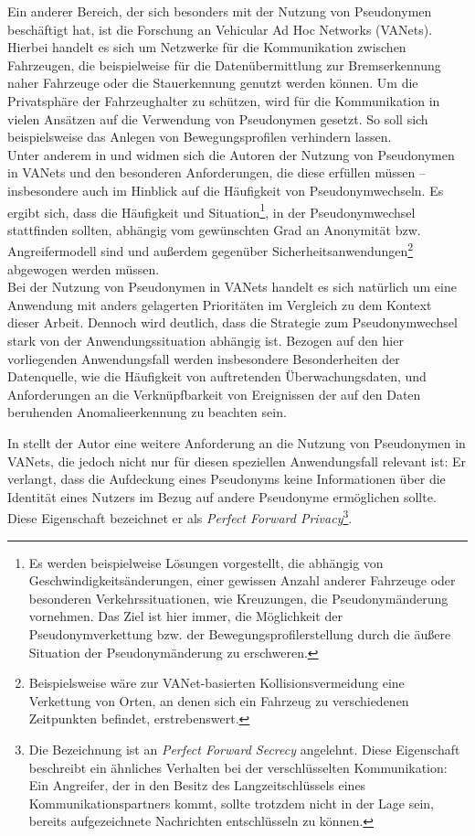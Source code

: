 Ein anderer Bereich, der sich besonders mit der Nutzung von Pseudonymen beschäftigt hat, ist die Forschung an Vehicular Ad Hoc Networks (VANets). Hierbei handelt es sich um Netzwerke für die Kommunikation zwischen Fahrzeugen, die beispielweise für die Datenübermittlung zur Bremserkennung naher Fahrzeuge oder die Stauerkennung genutzt werden können. Um die Privatsphäre der Fahrzeughalter zu schützen, wird für die Kommunikation in vielen Ansätzen auf die Verwendung von Pseudonymen gesetzt. So soll sich beispielsweise das Anlegen von Bewegungsprofilen verhindern lassen.\\
Unter anderem in \cite{dotzer2005} und \cite{petit2015} widmen sich die Autoren der Nutzung von Pseudonymen in VANets und den besonderen Anforderungen, die diese erfüllen müssen -- insbesondere auch im Hinblick auf die Häufigkeit von Pseudonymwechseln. Es ergibt sich, dass die Häufigkeit und Situation\footnote{
  Es werden beispielweise Lösungen vorgestellt, die abhängig von Geschwindigkeitsänderungen, einer gewissen Anzahl anderer Fahrzeuge oder besonderen Verkehrssituationen, wie Kreuzungen, die Pseudonymänderung vornehmen. Das Ziel ist hier immer, die Möglichkeit der Pseudonymverkettung bzw. der Bewegungsprofilerstellung durch die äußere Situation der Pseudonymänderung zu erschweren.
}, in der Pseudonymwechsel stattfinden sollten, abhängig vom gewünschten Grad an Anonymität bzw. Angreifermodell sind und außerdem gegenüber Sicherheitsanwendungen\footnote{
  Beispielsweise wäre zur VANet-basierten Kollisionsvermeidung eine Verkettung von Orten, an denen sich ein Fahrzeug zu verschiedenen Zeitpunkten befindet, erstrebenswert.
}  abgewogen werden müssen.\\
Bei der Nutzung von Pseudonymen in VANets handelt es sich natürlich um eine Anwendung mit anders gelagerten Prioritäten im Vergleich zu dem Kontext dieser Arbeit. Dennoch wird deutlich, dass die Strategie zum Pseudonymwechsel stark von der Anwendungssituation abhängig ist. Bezogen auf den hier vorliegenden Anwendungsfall werden insbesondere Besonderheiten der Datenquelle, wie die Häufigkeit von auftretenden Überwachungsdaten, und Anforderungen an die Verknüpfbarkeit von Ereignissen der auf den Daten beruhenden Anomalieerkennung zu beachten sein.


In \cite{schaub2009} stellt der Autor eine weitere Anforderung an die Nutzung von Pseudonymen in VANets, die jedoch nicht nur für diesen speziellen Anwendungsfall relevant ist: Er verlangt, dass die Aufdeckung eines Pseudonyms keine Informationen über die Identität eines Nutzers im Bezug auf andere Pseudonyme ermöglichen sollte. Diese Eigenschaft bezeichnet er als \textit{Perfect Forward Privacy}\footnote{
  Die Bezeichnung ist an \textit{Perfect Forward Secrecy} angelehnt. Diese Eigenschaft beschreibt ein ähnliches Verhalten bei der verschlüsselten Kommunikation: Ein Angreifer, der in den Besitz des Langzeitschlüssels eines Kommunikationspartners kommt, sollte trotzdem nicht in der Lage sein, bereits aufgezeichnete Nachrichten entschlüsseln zu können.
}.

